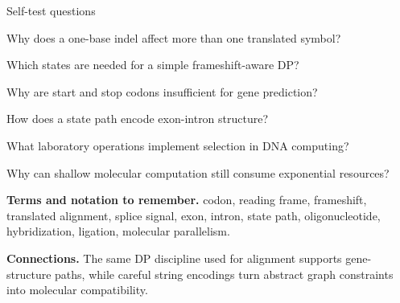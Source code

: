 \documentclass[11pt,letterpaper]{article}
\begin{document}
\begin{CornellExamBox}{Self-test questions}
\begin{CornellRecallList}
  \item Why does a one-base indel affect more than one translated symbol?
  \item Which states are needed for a simple frameshift-aware DP?
  \item Why are start and stop codons insufficient for gene prediction?
  \item How does a state path encode exon-intron structure?
  \item What laboratory operations implement selection in DNA computing?
  \item Why can shallow molecular computation still consume exponential resources?
\end{CornellRecallList}
\end{CornellExamBox}

{\footnotesize
\textbf{Terms and notation to remember.} codon, reading frame, frameshift, translated alignment, splice signal, exon, intron, state path, oligonucleotide, hybridization, ligation, molecular parallelism.

\textbf{Connections.} The same DP discipline used for alignment supports gene-structure paths, while careful string encodings turn abstract graph constraints into molecular compatibility.
}
\end{document}
